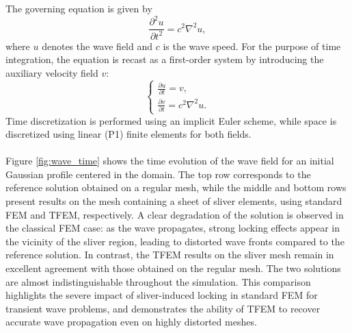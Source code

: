 \documentclass{article}
\begin{document}
The governing equation is given by
\begin{equation}
\frac{\partial^2 u}{\partial t^2} = c^2 \nabla^2 u,
\end{equation}
where $u$ denotes the wave field and $c$ is the wave speed. For the purpose of time integration, the equation is recast as a first-order system by introducing the auxiliary velocity field $v$:
\begin{equation}
\begin{cases}
\frac{\partial u}{\partial t} = v, \\
\frac{\partial v}{\partial t} = c^2 \nabla^2 u.
\end{cases}
\end{equation}
Time discretization is performed using an implicit Euler scheme, while space is discretized using linear (P1) finite elements for both fields.\\
\\
Figure \ref{fig:wave_time} shows the time evolution of the wave field for an initial Gaussian profile centered in the domain. The top row corresponds to the reference solution obtained on a regular mesh, while the middle and bottom rows present results on the mesh containing a sheet of sliver elements, using standard FEM and TFEM, respectively. A clear degradation of the solution is observed in the classical FEM case: as the wave propagates, strong locking effects appear in the vicinity of the sliver region, leading to distorted wave fronts compared to the reference solution. In contrast, the TFEM results on the sliver mesh remain in excellent agreement with those obtained on the regular mesh. The two solutions are almost indistinguishable throughout the simulation. This comparison highlights the severe impact of sliver-induced locking in standard FEM for transient wave problems, and demonstrates the ability of TFEM to recover accurate wave propagation even on highly distorted meshes.
\end{document}
